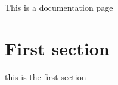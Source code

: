 This is a documentation page\hypertarget{_a_sec}{}\section{First section}\label{_a_sec}
this is the first section 